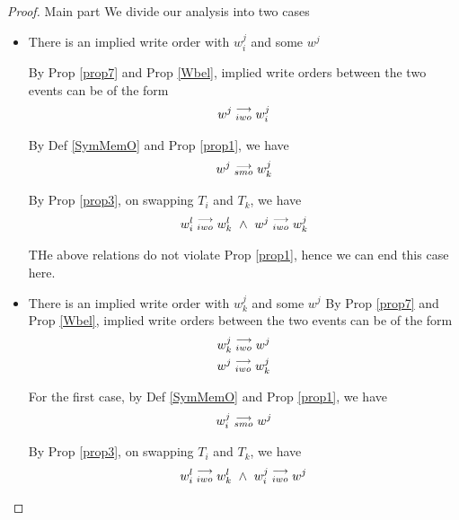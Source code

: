 \begin{proof}{Main part}
                We divide our analysis into two cases 
                \begin{itemize}
                    \item There is an implied write order with $w_i^j$ and some $w^j$
                    
                        By Prop \ref{prop7} and Prop \ref{Wbel}, implied write orders between the two events can be of the form 
                        \begin{align*}
                            w^j\stackrel{\longrightarrow}{_{iwo}}w_i^j 
                        \end{align*}

                        By Def \ref{SymMemO} and Prop \ref{prop1}, we have
                        \begin{align*}
                            w^j\stackrel{\longrightarrow}{_{smo}}w_k^j
                        \end{align*}

                        By Prop \ref{prop3}, on swapping $T_i$ and $T_k$, we have 
                        \begin{align*}
                            \reln{w_i^l}{iwo}{w_k^l} \ \wedge \ \reln{w^j}{iwo}{w_k^j}
                        \end{align*}

                        THe above relations do not violate Prop \ref{prop1}, hence we can end this case here. 
                    
                    \item There is an implied write order with $w_k^j$ and some $w^j$
                        By Prop \ref{prop7} and Prop \ref{Wbel}, implied write orders between the two events can be of the form 
                        \begin{align*}
                            w_k^j\stackrel{\longrightarrow}{_{iwo}}w^j \\ 
                            w^j\stackrel{\longrightarrow}{_{iwo}}w_k^j  
                        \end{align*}

                        For the first case, by Def \ref{SymMemO} and Prop \ref{prop1}, we have
                        \begin{align*}
                            w_i^j\stackrel{\longrightarrow}{_{smo}}w^j
                        \end{align*}

                        By Prop \ref{prop3}, on swapping $T_i$ and $T_k$, we have 
                        \begin{align*}
                            \reln{w_i^l}{iwo}{w_k^l} \ \wedge \ \reln{w_i^j}{iwo}{w^j}
                        \end{align*}


\end{itemize}
\end{proof}
